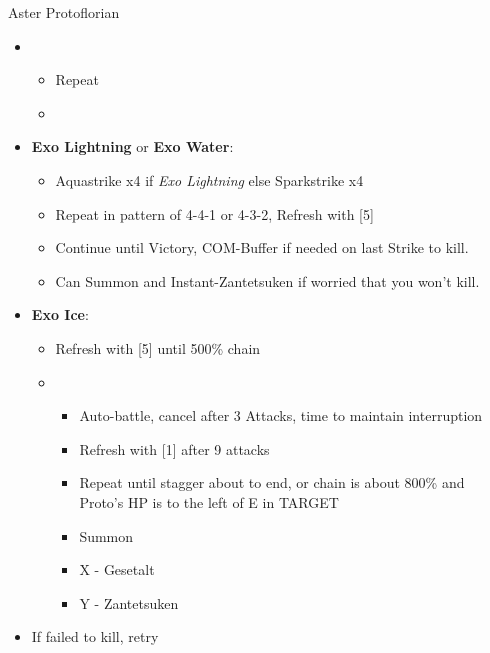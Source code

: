 \begin{paracol}{2}
\begin{battle}{Aster Protoflorian}
\begin{itemize}
			\item \fourth
			      \begin{itemize}
				      \item Repeat
				      \item \stagger
			      \end{itemize}
			\item \textbf{Exo Lightning} or \textbf{Exo Water}:
			      \begin{itemize}
				      \item Aquastrike x4 if \textit{Exo Lightning} else Sparkstrike x4
				      \item Repeat in pattern of 4-4-1 or 4-3-2, Refresh with [5]
				      \item Continue until Victory, COM-Buffer if needed on last Strike to kill.
				      \item Can Summon and Instant-Zantetsuken if worried that you won't kill.
			      \end{itemize}
			\item \textbf{Exo Ice}:
			      \begin{itemize}
				      \item Refresh with [5] until 500\% chain
				      \item \sixth
				            \begin{itemize}
					            \item Auto-battle, cancel after 3 Attacks, time to maintain interruption
					            \item Refresh with [1] after 9 attacks
					            \item Repeat until stagger about to end, or chain is about 800\% and Proto's HP is to the left of E in TARGET
					            \item Summon
					            \item X - Gesetalt
					            \item Y - Zantetsuken
				            \end{itemize}
			      \end{itemize}
			\item If failed to kill, retry
		\end{itemize}


\end{battle}
\end{paracol}
